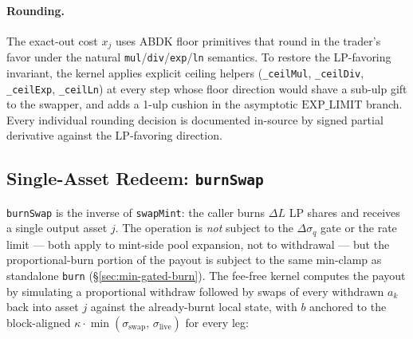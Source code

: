 \documentclass[11pt]{article}
\begin{document}
\paragraph{Rounding.}
The exact-out cost $x_j$ uses ABDK floor primitives that round in the
trader's favor under the natural
\texttt{mul}/\texttt{div}/\texttt{exp}/\texttt{ln} semantics. To
restore the LP-favoring invariant, the kernel applies explicit
ceiling helpers (\texttt{\_ceilMul}, \texttt{\_ceilDiv},
\texttt{\_ceilExp}, \texttt{\_ceilLn}) at every step whose floor
direction would shave a sub-ulp gift to the swapper, and adds a 1-ulp
cushion in the asymptotic $\mathrm{EXP\_LIMIT}$ branch. Every
individual rounding decision is documented in-source by signed
partial derivative against the LP-favoring direction.

\subsection{Single-Asset Redeem: \texttt{burnSwap}}
\label{sec:burnswap}

\texttt{burnSwap} is the inverse of \texttt{swapMint}: the caller
burns $\Delta L$ LP shares and receives a single output asset $j$. The
operation is \emph{not} subject to the $\Delta\sigma_q$ gate
or the rate limit --- both apply to mint-side pool expansion, not to
withdrawal --- but the proportional-burn portion of the payout is
subject to the same min-clamp as standalone \texttt{burn}
(\S\ref{sec:min-gated-burn}). The fee-free kernel computes the payout
by simulating a proportional withdraw followed by swaps of every
withdrawn $a_k$ back into asset $j$ against the already-burnt local
state, with $b$ anchored to the block-aligned $\kappa \cdot
\min(\sigma_{\mathrm{swap}},\,\sigma_{\mathrm{live}})$ for every leg:
\end{document}
